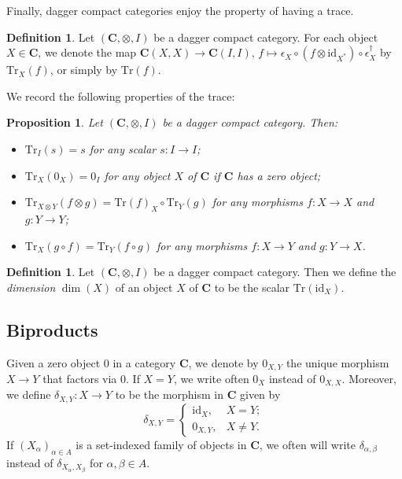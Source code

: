 \documentclass[12pt]{tac}
\newtheorem{proposition}[theorem]{Proposition}
\theoremstyle{definition}
\newtheorem{definition}[theorem]{Definition}
\theoremstyle{remark}
\newcommand{\<}{\langle}
\renewcommand{\>}{\rangle}
\renewcommand{\:}{\colon}
\newcommand{\Tr}{\mathrm{Tr}}
\newcommand{\id}{\mathrm{id}}
\begin{document}
Finally, dagger compact categories enjoy the property of having a trace.

\begin{definition}
    Let $(\mathbf C,\otimes,I)$ be a dagger compact category. For each object $X\in\mathbf C$, we denote the map $\mathbf C(X,X)\to\mathbf C(I,I)$, $f\mapsto\epsilon_X\circ (f\otimes\id_{X^*})\circ\epsilon_X^\dag$ by $\Tr_X(f)$, or simply by $\Tr(f)$.
\end{definition}

We record the following properties of the trace:
\begin{proposition}\cite[Lemmas 3.61 \& 3.63]{heunenvicary}\label{prop:trace properties}
  Let $(\mathbf C,\otimes,I)$ be a dagger compact category. Then:
  \begin{itemize}
      \item[(a)] $\Tr_I(s)=s$ for any scalar $s:I\to I$;
      \item[(b)] $\Tr_X(0_X)=0_I$ for any object $X$ of $\mathbf C$ if $\mathbf C$ has a zero object;
      \item[(c)] $\Tr_{X\otimes Y}(f\otimes g)=\Tr(f)_X\circ\Tr_Y(g)$ for any morphisms $f:X\to X$ and $g:Y\to Y$;
      \item[(d)] $\Tr_X(g\circ f)=\Tr_Y(f\circ g)$ for any morphisms $f:X\to Y$ and $g:Y\to X$.
  \end{itemize}
\end{proposition}

\begin{definition}
    Let $(\mathbf C,\otimes,I)$ be a dagger compact category. Then we define the \emph{dimension} $\dim(X)$ of an object $X$ of $\mathbf C$ to be the scalar $\Tr(\id_X)$.
\end{definition}


\subsection{Biproducts}


Given a zero object $0$ in a category $\mathbf C$, we denote by $0_{X,Y}$ the unique morphism $X\to Y$ that factors via $0$. If $X=Y$, we write often $0_{X}$ instead of $0_{X,X}$. Moreover, we define $\delta_{X,Y}:X\to Y$ to be the morphism in $\mathbf C$ given by
\[\delta_{X,Y}=\begin{cases}
    \id_X, & X=Y;\\
    0_{X,Y}, & X\neq Y.
\end{cases}\]
If $(X_\alpha)_{\alpha\in A}$ is a set-indexed family of objects in $\mathbf C$, we often will write $\delta_{\alpha,\beta}$ instead of $\delta_{X_\alpha,X_\beta}$ for $\alpha,\beta\in A$.
\end{document}

